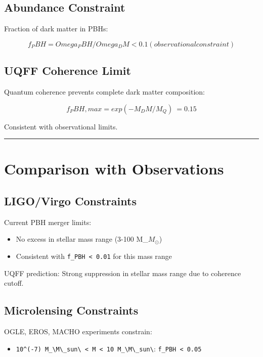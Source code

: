 \documentclass[12pt,a4paper]{article}
\begin{document}
\subsection{Abundance Constraint}

Fraction of dark matter in PBHs:

\begin{equation}
f_PBH = Omega_PBH/Omega_DM < 0.1 (observational constraint)
\end{equation}

\subsection{UQFF Coherence Limit}

Quantum coherence prevents complete dark matter composition:

\begin{equation}
f_PBH,max = exp(-M_DM/M_Q) ~= 0.15
\end{equation}

Consistent with observational limits.

\medskip\hrule\medskip

\section{Comparison with Observations}

\subsection{LIGO/Virgo Constraints}

Current PBH merger limits:

\begin{itemize}
  \item No excess in stellar mass range (3-100 M\_{$M_{\odot}$})
  \item Consistent with \texttt{f\_PBH < 0.01} for this mass range
\end{itemize}

UQFF prediction: Strong suppression in stellar mass range due to coherence cutoff.

\subsection{Microlensing Constraints}

OGLE, EROS, MACHO experiments constrain:

\begin{itemize}
  \item \texttt{10\^{}(-7) M\_\textbackslash {M\textbackslash \_sun\textbackslash } < M < 10 M\_\textbackslash {M\textbackslash \_sun\textbackslash }}: \texttt{f\_PBH < 0.05}
\end{itemize}
\end{document}
